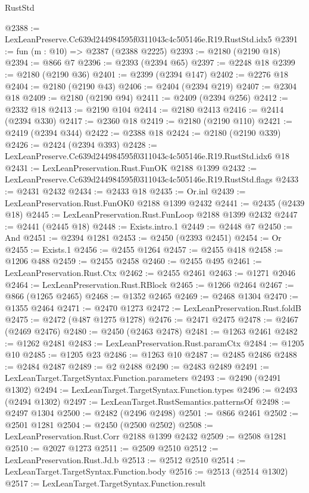 \begin{lexlean}{RustStd}
\begin{coremodule}
@2388 := LexLeanPreserve.Cc639d244984595f0311043c4c505146e.R19.RustStd.idx5
@2391 := fun (m : @10) => @2387 (@2388 @2225)
@2393 := @2180 (@2190 @18)
@2394 := @866 @7
@2396 := @2393 (@2394 @65)
@2397 := @2248 @18
@2399 := @2180 (@2190 @36)
@2401 := @2399 (@2394 @147)
@2402 := @2276 @18
@2404 := @2180 (@2190 @43)
@2406 := @2404 (@2394 @219)
@2407 := @2304 @18
@2409 := @2180 (@2190 @94)
@2411 := @2409 (@2394 @256)
@2412 := @2332 @18
@2413 := @2190 @104
@2414 := @2180 @2413
@2416 := @2414 (@2394 @330)
@2417 := @2360 @18
@2419 := @2180 (@2190 @110)
@2421 := @2419 (@2394 @344)
@2422 := @2388 @18
@2424 := @2180 (@2190 @339)
@2426 := @2424 (@2394 @393)
@2428 := LexLeanPreserve.Cc639d244984595f0311043c4c505146e.R19.RustStd.idx6 @18
@2431 := LexLeanPreservation.Rust.FunOK @2188 @1399
@2432 := LexLeanPreserve.Cc639d244984595f0311043c4c505146e.R19.RustStd.flags
@2433 := @2431 @2432
@2434 := @2433 @18
@2435 := Or.inl
@2439 := LexLeanPreservation.Rust.FunOK0 @2188 @1399 @2432
@2441 := @2435 (@2439 @18)
@2445 := LexLeanPreservation.Rust.FunLoop @2188 @1399 @2432
@2447 := @2441 (@2445 @18)
@2448 := Exists.intro.{1}
@2449 := @2448 @7
@2450 := And
@2451 := @2394 @1281
@2453 := @2450 (@2393 @2451)
@2454 := Or
@2455 := Exists.{1}
@2456 := @2455 @1264
@2457 := @2455 @418
@2458 := @1206 @488
@2459 := @2455 @2458
@2460 := @2455 @495
@2461 := LexLeanPreservation.Rust.Ctx
@2462 := @2455 @2461
@2463 := @1271 @2046
@2464 := LexLeanPreservation.Rust.RBlock
@2465 := @1266 @2464
@2467 := @866 (@1265 @2465)
@2468 := @1352 @2465
@2469 := @2468 @1304
@2470 := @1355 @2464
@2471 := @2470 @1273
@2472 := LexLeanPreservation.Rust.foldB
@2475 := @2472 (@487 @1275 @1278)
@2476 := @2471 @2475
@2478 := @2467 (@2469 @2476)
@2480 := @2450 (@2463 @2478)
@2481 := @1263 @2461
@2482 := @1262 @2481
@2483 := LexLeanPreservation.Rust.paramCtx
@2484 := @1205 @10
@2485 := @1205 @23
@2486 := @1263 @10
@2487 := @2485 @2486
@2488 := @2484 @2487
@2489 := @2 @2488
@2490 := @2483 @2489
@2491 := LexLeanTarget.TargetSyntax.Function.parameters
@2493 := @2490 (@2491 @1302)
@2494 := LexLeanTarget.TargetSyntax.Function.types
@2496 := @2493 (@2494 @1302)
@2497 := LexLeanTarget.RustSemantics.patternsOf
@2498 := @2497 @1304
@2500 := @2482 (@2496 @2498)
@2501 := @866 @2461
@2502 := @2501 @1281
@2504 := @2450 (@2500 @2502)
@2508 := LexLeanPreservation.Rust.Corr @2188 @1399 @2432
@2509 := @2508 @1281
@2510 := @2027 @1273
@2511 := @2509 @2510
@2512 := LexLeanPreservation.Rust.Jd.b
@2513 := @2512 @2510
@2514 := LexLeanTarget.TargetSyntax.Function.body
@2516 := @2513 (@2514 @1302)
@2517 := LexLeanTarget.TargetSyntax.Function.result

\end{coremodule}
\end{lexlean}
